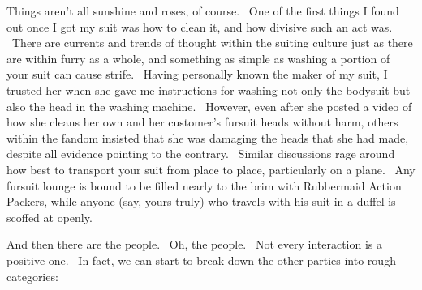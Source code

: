 Things aren't all sunshine and roses, of course. ~One of the first
things I found out once I got my suit was how to clean it, and how
divisive such an act was. ~There are currents and trends of thought
within the suiting culture just as there are within furry as a whole,
and something as simple as washing a portion of your suit can cause
strife. ~Having personally known the maker of my suit, I trusted her
when she gave me instructions for washing not only the bodysuit but also
the head in the washing machine. ~However, even after she posted a video
of how she cleans her own and her customer's fursuit heads without harm,
others within the fandom insisted that she was damaging the heads that
she had made, despite all evidence pointing to the contrary. ~Similar
discussions rage around how best to transport your suit from place to
place, particularly on a plane. ~Any fursuit lounge is bound to be
filled nearly to the brim with Rubbermaid Action Packers, while anyone
(say, yours truly) who travels with his suit in a duffel is scoffed at
openly.

And then there are the people. ~Oh, the people. ~Not every interaction
is a positive one. ~In fact, we can start to break down the other
parties into rough categories:


